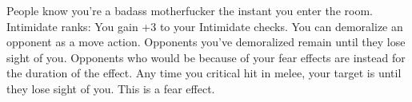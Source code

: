 \skillfeat
{People know you're a badass motherfucker the instant you enter the room.}
{Intimidate ranks:}
{You gain +3 to your Intimidate checks.}
{You can demoralize an opponent as a move action.}
{Opponents you've demoralized remain  until they lose sight of you.}
{Opponents who would be  because of your fear effects are  instead for the duration of the effect.}
{Any time you critical hit in melee, your target is  until they lose sight of you. This is a fear effect.}